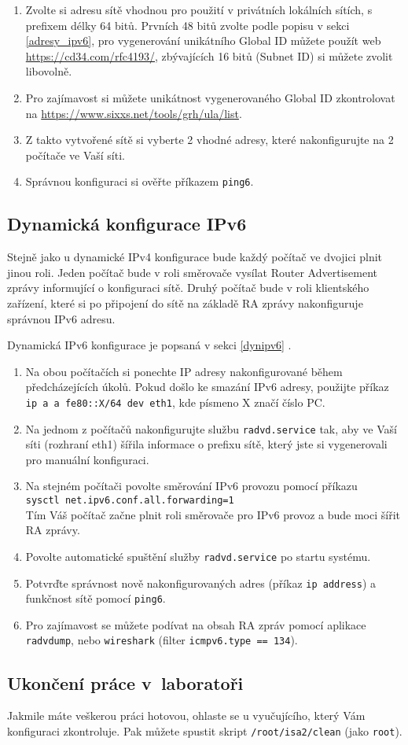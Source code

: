 \begin{enumerate}
    \item Zvolte si adresu sítě vhodnou pro použití v privátních lokálních
        sítích, s prefixem délky 64 bitů. Prvních 48 bitů zvolte podle popisu v
        sekci \ref{adresy_ipv6}, pro vygenerování unikátního Global ID můžete
        použít web \url{https://cd34.com/rfc4193/}, zbývajících 16 bitů (Subnet
        ID) si můžete zvolit libovolně.
    \item Pro zajímavost si můžete unikátnost vygenerovaného Global ID
        zkontrolovat na \url{https://www.sixxs.net/tools/grh/ula/list}.
    \item Z takto vytvořené sítě si vyberte 2 vhodné adresy, které
        nakonfigurujte na 2 počítače ve Vaší síti.
    \item Správnou konfiguraci si ověřte příkazem {\tt ping6}.
\end{enumerate}

\subsection{Dynamická konfigurace IPv6}
Stejně jako u dynamické IPv4 konfigurace bude každý počítač ve dvojici plnit
jinou roli. Jeden počítač bude v roli směrovače vysílat Router Advertisement
zprávy informující o konfiguraci sítě. Druhý počítač bude v roli klientského
zařízení, které si po připojení do sítě na základě RA zprávy nakonfiguruje
správnou IPv6 adresu.

Dynamická IPv6 konfigurace je popsaná v sekci \ref{dynipv6} .

\begin{enumerate}
    \item Na obou počítačích si ponechte IP adresy nakonfigurované během
        předcházejících úkolů. Pokud došlo ke smazání IPv6 adresy, použijte příkaz \texttt{ip a a fe80::X/64 dev eth1}, kde písmeno X značí číslo PC.
    \item Na jednom z počítačů nakonfigurujte službu \texttt{radvd.service} tak,
        aby ve Vaší síti (rozhraní eth1) šířila informace o prefixu sítě, který
        jste si vygenerovali pro manuální konfiguraci.
    \item Na stejném počítači povolte směrování IPv6 provozu pomocí příkazu\\
        \texttt{sysctl net.ipv6.conf.all.forwarding=1}\\
        Tím Váš počítač začne plnit roli směrovače pro IPv6 provoz a bude moci
        šířit RA zprávy.
    \item Povolte automatické spuštění služby \texttt{radvd.service} po startu systému.
    \item Potvrďte správnost nově nakonfigurovaných adres (příkaz \texttt{ip
        address}) a funkčnost sítě pomocí \texttt{ping6}.
    \item Pro zajímavost se můžete podívat na obsah RA zpráv pomocí aplikace
        \texttt{radvdump}, nebo \texttt{wireshark} (filter \texttt{icmpv6.type
        == 134}).
\end{enumerate}

\subsection{Ukončení práce v~laboratoři}
Jakmile máte veškerou práci hotovou, ohlaste se u vyučujícího, který Vám
konfiguraci zkontroluje. Pak můžete spustit skript {\tt /root/isa2/clean} (jako
\texttt{root}).
